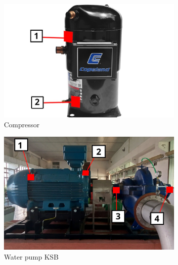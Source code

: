 \begin{figure}[ht]
\begin{subfigure}[b]{0.17\textwidth}
        \label{fig:machine:fan}
    \end{subfigure}
    \hfill
    \begin{subfigure}[b]{0.25\textwidth}
    		\centering
        \includegraphics[width=\textwidth]{assets/design/sensor/copeland-compressor.jpg}
        \caption{\footnotesize Compressor}
        \label{fig:machine:compressor}
    \end{subfigure}
    \hfill
    \begin{subfigure}[b]{0.31\textwidth}
    		\centering
        \includegraphics[width=\textwidth]{assets/design/sensor/ksb-pump.jpg}
        \caption{\footnotesize Water pump KSB}
        \label{fig:machine:pump-ksb}
    \end{subfigure}
    \hfill
    \begin{subfigure}[b]{0.31\textwidth}
    		\centering

\end{subfigure}
\end{figure}
